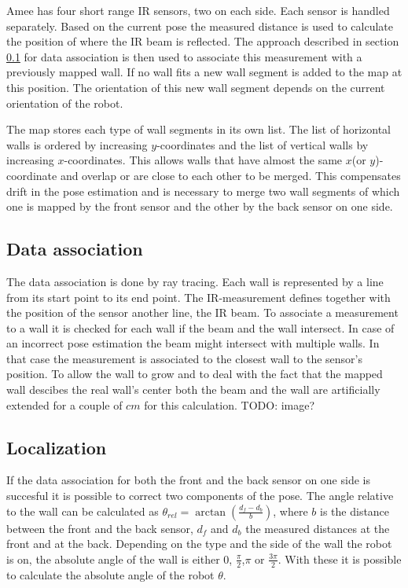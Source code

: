 Amee has four short range IR sensors, two on each side. Each sensor is handled separately. Based on the current pose the measured distance is used to calculate the position of where the IR beam is reflected. The approach described in section \ref{subsec:dataAssoc} for data association is then used to associate this measurement with a previously mapped wall. If no wall fits a new wall segment is added to the map at this position. The orientation of this new wall segment depends on the current orientation of the robot.

The map stores each type of wall segments in its own list. The list of horizontal walls is ordered by increasing $y$-coordinates and the list of vertical walls by increasing $x$-coordinates. This allows walls that have almost the same $x$(or $y$)-coordinate and overlap or are close to each other to be merged. This compensates drift in the pose estimation and is necessary to merge two wall segments of which one is mapped by the front sensor and the other by the back sensor on one side. 

\subsection{Data association}
\label{subsec:dataAssoc}
The data association is done by ray tracing. Each wall is represented by a line from its start point to its end point. The IR-measurement defines together with the position of the sensor another line, the IR beam. To associate a measurement to a wall it is checked for each wall if the beam and the wall intersect. In case of an incorrect pose estimation the beam might intersect with multiple walls. In that case the measurement is associated to the closest wall to the sensor's position. To allow the wall to grow and to deal with the fact that the mapped wall descibes the real wall's center both the beam and the wall are artificially extended for a couple of $cm$ for this calculation. TODO: image?    

\subsection{Localization}
\label{subsec:Localization}
If the data association for both the front and the back sensor on one side is succesful it is possible to correct two components of the pose. The angle relative to the wall can be calculated as $\theta_{rel} = \arctan(\frac{d_{f} - d_{b}}{b})$, where $b$ is the distance between the front and the back sensor, $d_f$ and $d_b$ the measured distances at the front and at the back. Depending on the type and the side of the wall the robot is on, the absolute angle of the wall is either $0$, $\frac{\pi}{2}$,$\pi$ or $\frac{3 \pi}{2}$. With these it is possible to calculate the absolute angle of the robot $\theta$.

